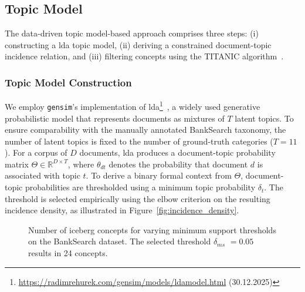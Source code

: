 

\subsection{Topic Model}
\label{sec:topic_model}
The data-driven topic model-based approach comprises three steps: (i) constructing a \ac{lda} topic model, (ii) deriving a constrained document-topic incidence relation, and (iii) filtering concepts using the TITANIC algorithm~\cite{gutekunst2025conceptual}.

\subsubsection{Topic Model Construction}
We employ \texttt{gensim}'s implementation of \ac{lda}\footnote{\url{https://radimrehurek.com/gensim/models/ldamodel.html} (30.12.2025)}~\cite{alghamdi_survey_2015}, a widely used generative probabilistic model that represents documents as mixtures of $T$ latent topics.
To ensure comparability with the manually annotated BankSearch taxonomy, the number of latent topics is fixed to the number of ground-truth categories ($T=11$).
For a corpus of $D$ documents, \ac{lda} produces a document-topic probability matrix $\Theta \in \mathbb{R}^{D \times T}$, where $\theta_{dt}$ denotes the probability that document $d$ is associated with topic $t$.
To derive a binary formal context from $\Theta$, document-topic probabilities are thresholded using a minimum topic probability $\delta_t$.
The threshold is selected empirically using the elbow criterion on the resulting incidence density, as illustrated in Figure~\ref{fig:incidence_density}.%

\begin{figure}[t]
\centering
\begin{minipage}{0.49\textwidth}
    \centering
    
    \caption{\ac{lda} document-topic incidence density for varying thresholds $\delta_t$ on the BankSearch dataset. The elbow criterion selects $\delta_t=0.07$, yielding a density slightly above $0.2$.}
    \label{fig:incidence_density}
\end{minipage}\hfill
\begin{minipage}{0.49\textwidth}
    \centering
    
    \caption{Number of iceberg concepts for varying minimum support thresholds on the BankSearch dataset. The selected threshold { $\delta_{ms}$} $=0.05$ results in 24 concepts.}
    \label{fig:concepts_support}
\end{minipage}
\end{figure}


